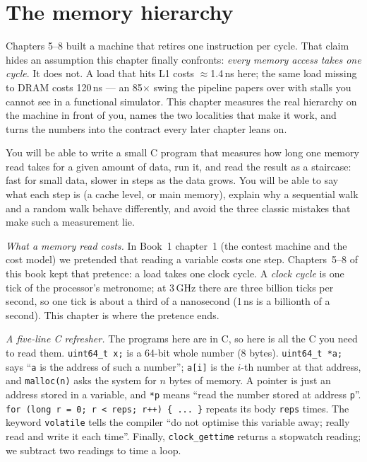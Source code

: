 \chapter{The memory hierarchy}
\label{ch:systems09}

Chapters 5--8 built a machine that retires one instruction per cycle.
That claim hides an assumption this chapter finally confronts:
\emph{every memory access takes one cycle}. It does not. A load
that hits L1 costs $\approx$1.4\,ns here; the same load missing to
DRAM costs 120\,ns --- an 85$\times$ swing the pipeline papers over
with stalls you cannot see in a functional simulator. This chapter
measures the real hierarchy on the machine in front of you, names
the two localities that make it work, and turns the numbers into the
contract every later chapter leans on.

\begin{rulebox}
You will be able to write a small C program that measures how long one
memory read takes for a given amount of data, run it, and read the
result as a staircase: fast for small data, slower in steps as the data
grows. You will be able to say what each step is (a cache level, or
main memory), explain why a sequential walk and a random walk behave
differently, and avoid the three classic mistakes that make such a
measurement lie.
\end{rulebox}

\begin{rulebox}
\emph{What a memory read costs.} In Book~1 chapter~1 (the contest
machine and the cost model) we pretended that reading a variable costs
one step. Chapters~5--8 of this book kept that pretence: a load takes one
clock cycle. A \emph{clock cycle} is one tick of the processor's
metronome; at 3\,GHz there are three billion ticks per second, so one
tick is about a third of a nanosecond (1\,ns is a billionth of a
second). This chapter is where the pretence ends.

\emph{A five-line C refresher.} The programs here are in C, so here is
all the C you need to read them.
\texttt{uint64\_t x;} is a 64-bit whole number (8 bytes).
\texttt{uint64\_t *a;} says ``\texttt{a} is the address of such a
number''; \texttt{a[i]} is the \(i\)-th number at that address,
and \texttt{malloc(n)} asks the system for \(n\) bytes of memory.
A pointer is just an address stored in a variable, and
\texttt{*p} means ``read the number stored at address \texttt{p}''.
\texttt{for (long r = 0; r < reps; r++) \{ ... \}} repeats its body
\texttt{reps} times. The keyword \texttt{volatile} tells the compiler
``do not optimise this variable away; really read and write it each
time''. Finally, \texttt{clock\_gettime} returns a stopwatch reading;
we subtract two readings to time a loop.
\end{rulebox}

